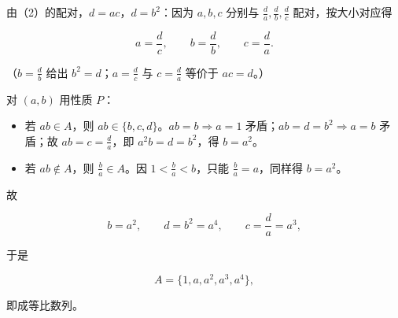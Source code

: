 \begin{answer}
由（2）的配对，$d=ac$，$d=b^2$：因为 $a,b,c$ 分别与 $\frac da,\frac db,\frac dc$ 配对，按大小对应得

\nopagebreak[4]
\[a=\frac dc,\qquad b=\frac db,\qquad c=\frac da .\]

（$b=\frac db$ 给出 $b^2=d$；$a=\frac dc$ 与 $c=\frac da$ 等价于 $ac=d$。）

对 $(a,b)$ 用性质 $P$：

\begin{itemize}
\item 若 $ab\in A$，则 $ab\in\{b,c,d\}$。$ab=b\Rightarrow a=1$ 矛盾；$ab=d=b^2\Rightarrow a=b$ 矛盾；故 $ab=c=\frac da$，即 $a^2b=d=b^2$，得 $b=a^2$。
\item 若 $ab\notin A$，则 $\frac ba\in A$。因 $1<\frac ba<b$，只能 $\frac ba=a$，同样得 $b=a^2$。
\end{itemize}

故

\nopagebreak[4]
\[b=a^2,\qquad d=b^2=a^4,\qquad c=\frac da=a^3,\]

于是

\nopagebreak[4]
\[A=\{1,a,a^2,a^3,a^4\},\]

即成等比数列。


\end{answer}